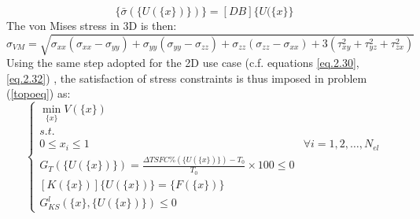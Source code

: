  \begin{equation}
 \label{e.24}
 \lbrace\bar{\sigma}\left(\lbrace U\left(\lbrace x\rbrace\right)\rbrace\right)\rbrace=\left[DB\right]\lbrace U(\lbrace x \rbrace\rbrace
 \end{equation}
  The von Mises stress in 3D is then:
  \begin{equation}
  \label{e.20}
  \sigma_{VM}=\sqrt{\sigma_{xx}(\sigma_{xx}-\sigma_{yy})+\sigma_{yy}(\sigma_{yy}-\sigma_{zz})+\sigma_{zz}(\sigma_{zz}-\sigma_{xx})+3(\tau_{xy}^2+\tau_{yz}^2+\tau_{zx}^2)}
  \end{equation}
Using the same step adopted for the 2D use case (c.f. equations \ref{eq.2.30}, \ref{eq.2.32})
, the satisfaction of stress constraints is thus imposed in problem (\ref{topoeq}) as:
\begin{equation}
\label{topoeq2}
\left\lbrace\begin{array}{cc}
\underset{\lbrace x\rbrace}{\min} V\left(\lbrace x\rbrace\right)& \\
s.t. & \\ 0\leq x_i \leq 1  & \forall i=1,2,\dots,N_{el}\\
G_T\left(\lbrace U\left(\lbrace x\rbrace\right)\rbrace\right)=\frac{\Delta TSFC \%\left(\lbrace U\left(\lbrace x\rbrace\right)\rbrace\right)-T_0}{T_0}\times 100 \leq 0 & \\
\left[K\left(\lbrace x\rbrace\right)\right]\lbrace U \left(\lbrace x\rbrace\right) \rbrace = \lbrace F \left(\lbrace x\rbrace\right)\rbrace & \\
G^{l}_{KS}(\lbrace x\rbrace,\lbrace U\left(\lbrace x\rbrace\right)\rbrace)\leq 0
\end{array}\right.
\end{equation}
